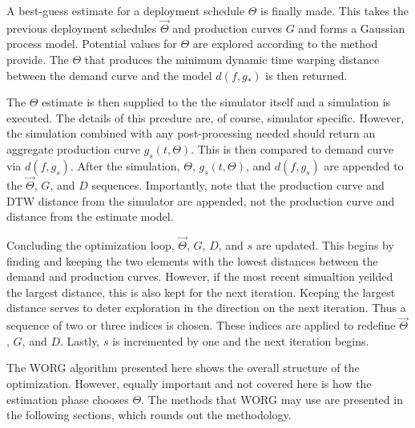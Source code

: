 A best-guess estimate for a deployment schedule $\Theta$ is finally 
made.  This takes the previous deployment schedules $\vec{\Theta}$ and
production curves $G$ and forms a Gaussian process model. Potential 
values for $\Theta$ are explored according to the method provide.  The 
$\Theta$ that produces the minimum dynamic time warping distance between
the demand curve and the model $d(f, g_*)$ is then returned.

The $\Theta$ estimate is then supplied to the the simulator itself and 
a simulation is executed.  The details of this prcedure are, of course,
simulator specific.  However, the simulation combined with any post-processing 
needed should return an aggregate production curve $g_s(t, \Theta)$.  
This is then compared to demand curve via $d(f, g_s)$. After the simulation, 
$\Theta$, $g_s(t, \Theta)$, and $d(f, g_s)$ are appended to the 
$\vec{\Theta}$, $G$, and $D$ sequences.  Importantly, note that the 
production curve and DTW distance from the simulator are appended, 
not the production curve and distance from the estimate model.

Concluding the optimization loop, $\vec{\Theta}$, $G$, $D$, and $s$ are
updated.  This begins by finding and keeping the two elements with the 
lowest distances between the demand and production curves.  However, 
if the most recent simualtion yeilded the largest distance, this is also
kept for the next iteration. Keeping the largest distance serves to deter
exploration in the direction on the next iteration.  Thus a sequence of 
two or three indices is chosen. These indices are applied to redefine
$\vec{\Theta}$, $G$, and $D$. Lastly, $s$ is incremented by one and the
next iteration begins.

The WORG algorithm presented here shows the overall structure of the 
optimization.  However, equally important and not covered here is how the
estimation phase chooses $\Theta$.  The methods that WORG may use are 
presented in the following sections, which rounds out the methodology. 